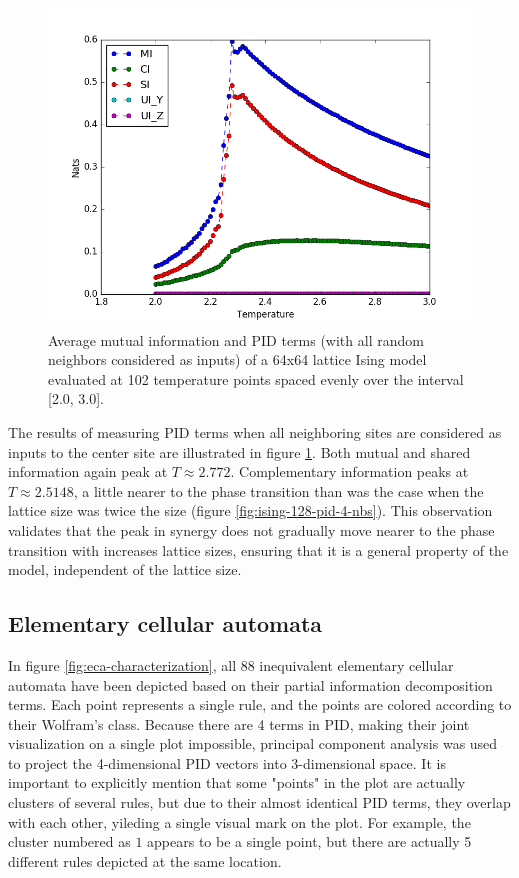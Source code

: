 \documentclass[12pt]{article}
\begin{document}
\begin{figure} [h!]
\begin{center}
\includegraphics[width=\textwidth]{ising-64-pid-4-nbs}
\caption{Average mutual information and PID terms (with all random neighbors considered as inputs) of a 64x64 lattice Ising model evaluated at 102 temperature points spaced evenly over the interval [2.0, 3.0].}
\label{fig:ising-64-pid-4-nbs}
\end{center}
\end{figure}

The results of measuring PID terms when all neighboring sites are considered as inputs to the center site are illustrated in figure \ref{fig:ising-64-pid-4-nbs}. Both mutual and shared information again peak at $T \approx 2.772$. Complementary information peaks at $T \approx 2.5148$, a little nearer to the phase transition than was the case when the lattice size was twice the size (figure \ref{fig:ising-128-pid-4-nbs}). This observation validates that the peak in synergy does not gradually move nearer to the phase transition with increases lattice sizes, ensuring that it is a general property of the model, independent of the lattice size.

\subsection{Elementary cellular automata}

In figure \ref{fig:eca-characterization}, all 88 inequivalent elementary cellular automata have been depicted based on their partial information decomposition terms. Each point represents a single rule, and the points are colored according to their Wolfram's class. Because there are 4 terms in PID, making their joint visualization on a single plot impossible, principal component analysis was used to project the 4-dimensional PID vectors into 3-dimensional space. It is important to explicitly mention that some "points" in the plot are actually clusters of several rules, but due to their almost identical PID terms, they overlap with each other, yileding a single visual mark on the plot.  For example, the cluster numbered as $1$ appears to be a single point, but there are actually 5 different rules depicted at the same location.   
\end{document}
